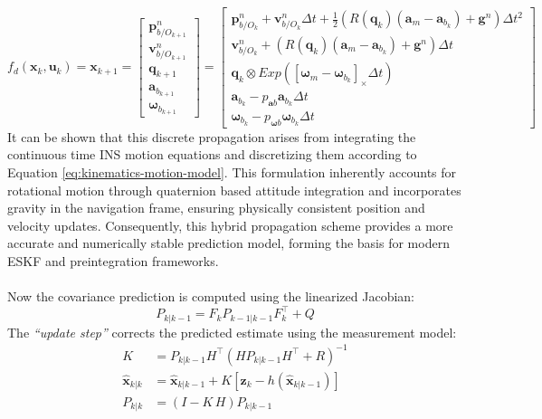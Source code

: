 \begin{equation}
    f_d(\mathbf{x}_k, \mathbf{u}_k) = 
    \mathbf{x}_{k+1} = 
    \begin{bmatrix}
        \mathbf{p}_{b/O_{k+1}}^{n} \\
        \mathbf{v}_{b/O_{k+1}}^{n} \\ 
        \mathbf{q}_{k+1} \\ 
        \mathbf{a}_{b_{k+1}} \\
        \mathbf{\omega}_{b_{k+1}}
    \end{bmatrix}
    =
    \begin{bmatrix}
        \mathbf{p}_{b/O_{k}}^{n} + \mathbf{v}_{b/O_{k}}^{n} \Delta t + \frac{1}{2} (R(\mathbf{q}_k) (\mathbf{a}_m - \mathbf{a}_{b_k}) + \mathbf{g}^n) \Delta t^2 \\
        \mathbf{v}_{b/O_{k}}^{n} + (R(\mathbf{q}_k) (\mathbf{a}_m - \mathbf{a}_{b_k}) + \mathbf{g}^n) \Delta t \\ 
        \mathbf{q}_{k} \otimes Exp([\mathbf{\omega}_m - \mathbf{\omega}_{b_k}]_{\times} \Delta t) \\ 
        \mathbf{a}_{b_{k}} - p_{\mathbf{a}b} \mathbf{a}_{b_{k}} \Delta t \\
        \mathbf{\omega}_{b_{k}} - p_{\mathbf{\omega}b} \mathbf{\omega}_{b_{k}} \Delta t
    \end{bmatrix}
    \label{eq:state-estimation-discrete-propagartion}
\end{equation}
It can be shown that this discrete propagation arises from integrating the continuous time INS motion equations and discretizing them according to Equation \ref{eq:kinematics-motion-model}. This formulation inherently accounts for rotational motion through quaternion based attitude integration and incorporates gravity in the navigation frame, ensuring physically consistent position and velocity updates. Consequently, this hybrid propagation scheme provides a more accurate and numerically stable prediction model, forming the basis for modern ESKF and preintegration frameworks.
\\ \\
Now the covariance prediction is computed using the linearized Jacobian:
$$
    P_{k|k-1} = F_k P_{k-1|k-1} F_k^\top + Q
$$
The \textit{``update step''} corrects the predicted estimate using the measurement model:
$$
\begin{aligned}
    K &= P_{k|k-1}H^\top(HP_{k|k-1}H^\top + R)^{-1} \\
    \hat{\mathbf{x}}_{k|k} &= \hat{\mathbf{x}}_{k|k-1} + K[\mathbf{z}_k - h(\hat{\mathbf{x}}_{k|k-1})] \\
    P_{k|k} &= (I - K\,H)P_{k|k-1}
\end{aligned}
$$

